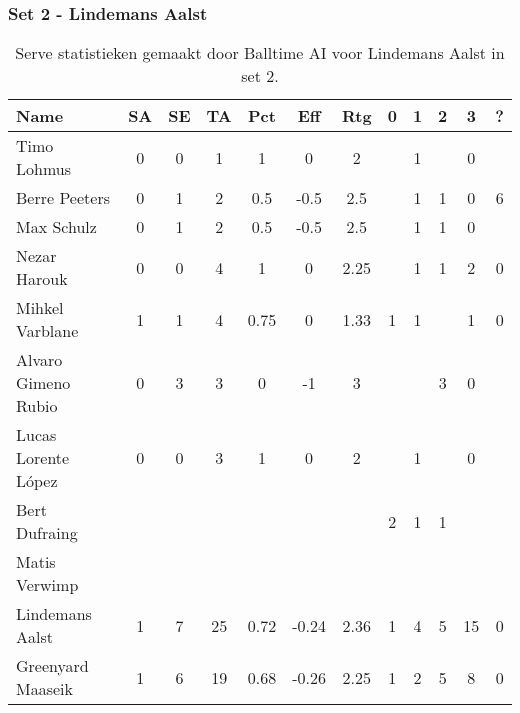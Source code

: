 \subsubsection{Set 2 - Lindemans Aalst}
\label{sec:PL3_Aalst2}

\begin{table}[ht!]
  \centering
  \scriptsize
  \begin{tabular}{|l|c|c|c|c|c|c|c|c|c|c|c|} \hline
    \textbf{Name} & SA & SE & TA & Pct & Eff & Rtg & 0 & 1 & 2 & 3 & ? \\ \hline
    Timo Lohmus & 0 & 0 & 1 & 1 & 0 & 2 &   & 1 &   & 0 &   \\
    Berre Peeters & 0 & 1 & 2 & 0.5 & -0.5 & 2.5 &   & 1 & 1 & 0 & 6 \\
    Max Schulz & 0 & 1 & 2 & 0.5 & -0.5 & 2.5 &   & 1 & 1 & 0 &   \\
    Nezar Harouk & 0 & 0 & 4 & 1 & 0 & 2.25 &   & 1 & 1 & 2 & 0 \\
    Mihkel Varblane & 1 & 1 & 4 & 0.75 & 0 & 1.33 & 1 & 1 &   & 1 & 0 \\
    Alvaro Gimeno Rubio & 0 & 3 & 3 & 0 & -1 & 3 &   &   & 3 & 0 &   \\
    Lucas Lorente López & 0 & 0 & 3 & 1 & 0 & 2 &   & 1 &   & 0 &   \\
    Bert Dufraing &   &   &   &   &   &   & 2 & 1 & 1 &   &   \\
    Matis Verwimp &   &   &   &   &   &   &   &   &   &   &   \\
    Lindemans Aalst & 1 & 7 & 25 & 0.72 & -0.24 & 2.36 & 1 & 4 & 5 & 15 & 0 \\
    Greenyard Maaseik & 1 & 6 & 19 & 0.68 & -0.26 & 2.25 & 1 & 2 & 5 & 8 & 0 \\ \hline
  \end{tabular}
  \caption[Serve statistieken gemaakt door Balltime AI voor Lindemans Aalst in set 2]{\label{tab:PL3ServeAalst2}Serve statistieken gemaakt door Balltime AI voor Lindemans Aalst in set 2.}
\end{table}

